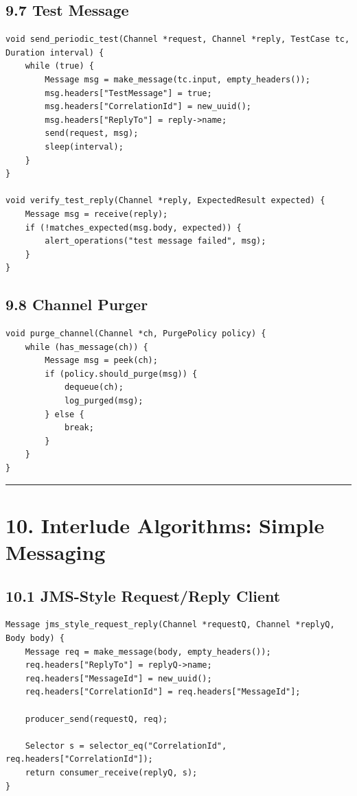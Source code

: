 \documentclass[11pt]{article}
\begin{document}
\subsection{9.7 Test Message}\label{test-message}

\begin{verbatim}
void send_periodic_test(Channel *request, Channel *reply, TestCase tc, Duration interval) {
    while (true) {
        Message msg = make_message(tc.input, empty_headers());
        msg.headers["TestMessage"] = true;
        msg.headers["CorrelationId"] = new_uuid();
        msg.headers["ReplyTo"] = reply->name;
        send(request, msg);
        sleep(interval);
    }
}

void verify_test_reply(Channel *reply, ExpectedResult expected) {
    Message msg = receive(reply);
    if (!matches_expected(msg.body, expected)) {
        alert_operations("test message failed", msg);
    }
}
\end{verbatim}

\subsection{9.8 Channel Purger}\label{channel-purger}

\begin{verbatim}
void purge_channel(Channel *ch, PurgePolicy policy) {
    while (has_message(ch)) {
        Message msg = peek(ch);
        if (policy.should_purge(msg)) {
            dequeue(ch);
            log_purged(msg);
        } else {
            break;
        }
    }
}
\end{verbatim}

\begin{center}\rule{0.5\linewidth}{0.5pt}\end{center}

\section{10. Interlude Algorithms: Simple
Messaging}\label{interlude-algorithms-simple-messaging}

\subsection{10.1 JMS-Style Request/Reply
Client}\label{jms-style-requestreply-client}

\begin{verbatim}
Message jms_style_request_reply(Channel *requestQ, Channel *replyQ, Body body) {
    Message req = make_message(body, empty_headers());
    req.headers["ReplyTo"] = replyQ->name;
    req.headers["MessageId"] = new_uuid();
    req.headers["CorrelationId"] = req.headers["MessageId"];

    producer_send(requestQ, req);

    Selector s = selector_eq("CorrelationId", req.headers["CorrelationId"]);
    return consumer_receive(replyQ, s);
}
\end{verbatim}
\end{document}
